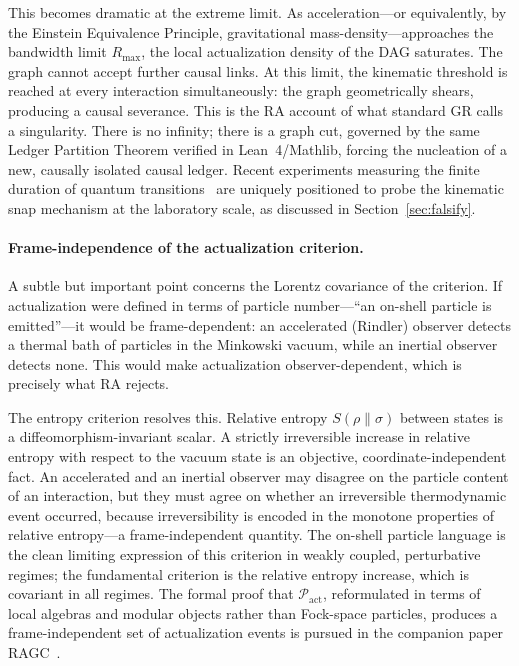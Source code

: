 \documentclass[11pt,a4paper]{article}
\theoremstyle{plain}
\theoremstyle{definition}
\theoremstyle{remark}
\begin{document}
This becomes dramatic at the extreme limit. As acceleration---or equivalently,
by the Einstein Equivalence Principle, gravitational mass-density---approaches
the bandwidth limit $R_{\mathrm{max}}$, the local actualization density of the
DAG saturates. The graph cannot accept further causal links. At this limit, the
kinematic threshold is reached at every interaction simultaneously: the graph
geometrically shears, producing a causal severance. This is the RA account of
what standard GR calls a singularity. There is no infinity; there is a graph cut,
governed by the same Ledger Partition Theorem verified in Lean~4/Mathlib, forcing
the nucleation of a new, causally isolated causal ledger. Recent experiments
measuring the finite duration of quantum transitions~\citep{Minev2019} are
uniquely positioned to probe the kinematic snap mechanism at the laboratory scale,
as discussed in Section~\ref{sec:falsify}.

\paragraph{Frame-independence of the actualization criterion.}
A subtle but important point concerns the Lorentz covariance of the criterion.
If actualization were defined in terms of particle number---``an on-shell particle
is emitted''---it would be frame-dependent: an accelerated (Rindler) observer
detects a thermal bath of particles in the Minkowski vacuum, while an inertial
observer detects none. This would make actualization observer-dependent, which
is precisely what RA rejects.

The entropy criterion resolves this. Relative entropy $S(\rho \| \sigma)$
between states is a diffeomorphism-invariant scalar. A strictly irreversible
increase in relative entropy with respect to the vacuum state is an objective,
coordinate-independent fact. An accelerated and an inertial observer may disagree
on the particle content of an interaction, but they must agree on whether an
irreversible thermodynamic event occurred, because irreversibility is encoded in
the monotone properties of relative entropy---a frame-independent quantity.
The on-shell particle language is the clean limiting expression of this criterion
in weakly coupled, perturbative regimes; the fundamental criterion is the relative
entropy increase, which is covariant in all regimes. The formal proof that
$\mathcal{P}_{\mathrm{act}}$, reformulated in terms of local algebras and modular objects rather than
Fock-space particles, produces a frame-independent set of actualization events is
pursued in the companion paper RAGC~\citep{Sandeman2026RAGC}.
\end{document}
